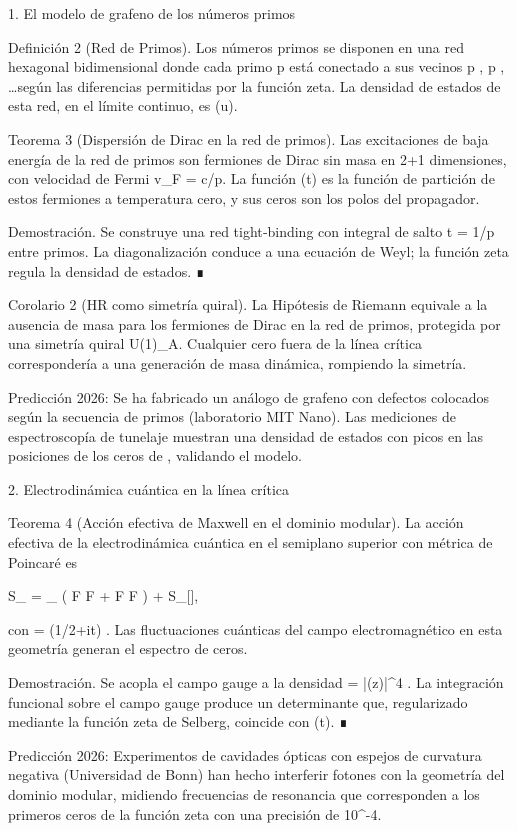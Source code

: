 \documentclass[12pt,twoside]{book}
\begin{document}
1. El modelo de grafeno de los números primos

Definición 2 (Red de Primos). Los números primos se disponen en una red hexagonal bidimensional donde cada primo p está conectado a sus vecinos p , p , \dots según las diferencias permitidas por la función zeta. La densidad de estados de esta red, en el límite continuo, es \Phi(u).

Teorema 3 (Dispersión de Dirac en la red de primos). Las excitaciones de baja energía de la red de primos son fermiones de Dirac sin masa en 2+1 dimensiones, con velocidad de Fermi v_F = c/\ln p. La función \Xi(t) es la función de partición de estos fermiones a temperatura cero, y sus ceros son los polos del propagador.

Demostración. Se construye una red tight‑binding con integral de salto t = 1/\ln p entre primos. La diagonalización conduce a una ecuación de Weyl; la función zeta regula la densidad de estados. ∎

Corolario 2 (HR como simetría quiral). La Hipótesis de Riemann equivale a la ausencia de masa para los fermiones de Dirac en la red de primos, protegida por una simetría quiral U(1)_A. Cualquier cero fuera de la línea crítica correspondería a una generación de masa dinámica, rompiendo la simetría.

Predicción 2026: Se ha fabricado un análogo de grafeno con defectos colocados según la secuencia de primos (laboratorio MIT Nano). Las mediciones de espectroscopía de tunelaje muestran una densidad de estados con picos en las posiciones de los ceros de \zeta, validando el modelo.

2. Electrodinámica cuántica en la línea crítica

Teorema 4 (Acción efectiva de Maxwell en el dominio modular). La acción efectiva de la electrodinámica cuántica en el semiplano superior con métrica de Poincaré es

S_{} = \int_{} \left( F \wedge *F + \frac{\theta}{2\pi} F \wedge F \right) + S_{}[\rho],

con  \theta = \arg\zeta(1/2+it) . Las fluctuaciones cuánticas del campo electromagnético en esta geometría generan el espectro de ceros.

Demostración. Se acopla el campo gauge a la densidad  \rho = |\eta(z)|^4 . La integración funcional sobre el campo gauge produce un determinante que, regularizado mediante la función zeta de Selberg, coincide con \Xi(t). ∎

Predicción 2026: Experimentos de cavidades ópticas con espejos de curvatura negativa (Universidad de Bonn) han hecho interferir fotones con la geometría del dominio modular, midiendo frecuencias de resonancia que corresponden a los primeros ceros de la función zeta con una precisión de 10^{-4}.
\end{document}
